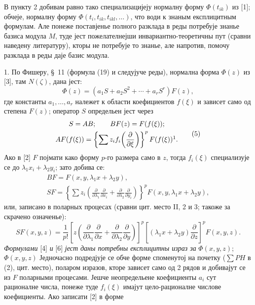 ﻿\documentclass[11pt]{article}
\providecommand{\p}{\partial}
\begin{document}
В пункту 2 добивам равно тако специализацијеју нормалну форму \(\Phi(t_{ik})\) из [1]; обчеје, нормалну форму \(\Phi(t_i,t_{ik},t_{ikl},\ldots)\), что води к знаным експлицитным формулам. Але понеже поставјенье полного разклада в реды потребује знанье базиса модула \(M\), туде јест пожелателнејши инвариантно-теоретичны пут (сравни наведену литературу), кторы не потребује то знанье, але напротив, помочу разклада в реды даје базис модула.

1. По Фишеру, \S~11 (формула (19) и следујуче реды), нормална форма \(\Phi(z)\) из [3], там \(N(\zeta)\), дана јест:
\begin{equation}
        \Phi(z)=(a_1S+a_2S^2+\cdots+a_rS^r)F(z),
\tag{4}
\end{equation}
где константы \(a_1,\ldots,a_r\) належет к области коефициентов \(f(\xi)\) и зависет само од степена \(F(z)\); оператор \(S\) определьен јест через
\begin{equation}
\begin{gathered}
        S=AB;\qquad BF(z)=F(f(\xi));\\
        AF(f(\xi))=\left\{\sum z_i f_i\!\left(\frac{\p}{\p\xi}\right)\right\}^{p}F(f(\xi))\footnotemark.
\end{gathered}
\tag{5}
\end{equation}
Ако в [2] \(F\) појмати како форму \(p\)-го размера само в \(z\), тогда \(f_i(\xi)\) специализује се до \(\lambda_1x_i+\lambda_2y_i\); зато добива се:
\[
\begin{gathered}
        BF=F(x,y,\lambda_1x+\lambda_2y),\\
        SF=\left\{\sum z_i\left(\frac{\p}{\p\lambda_1}\frac{\p}{\p x_i}+
        \frac{\p}{\p\lambda_2}\frac{\p}{\p y_i}\right)\right\}^{p}
        F(x,y,\lambda_1x+\lambda_2y),
\end{gathered}
\]
или, записано в поларных процесах (сравни цит. место II, 2 и 3; такоже за скрачено означенье):
\begin{equation}
        SF(x,y,z)=\frac1{p!}\left[z\left(\frac{\p}{\p\lambda_1}\frac{\p}{\p x}+
        \frac{\p}{\p\lambda_2}\frac{\p}{\p y}\right)\right]^p
        \left[(\lambda_1x+\lambda_2y)\frac{\p}{\p z}\right]^p F(x,y,z).
\tag{6}
\end{equation}
{\itshape Формулами} [4] {\itshape и} [6] {\itshape јест даны потребны експлицитны израз за} \(\Phi(x,y,z)\); \(\Phi(x,y,z)\) Једночасно подредјује се обче форме споменутој на почетку (\(\sum PH\) в (2), цит. место), поларом изразов, кторе зависет само од 2 рядов и добивајут се из \(F\) поларными процесами. Јешче неопредельене коефициенты \(a_i\) сут рационалне числа, понеже туде \(f_i(\xi)\) имајут цело-рационалне числове коефициенты. Ако записати [2] в форме
\end{document}
